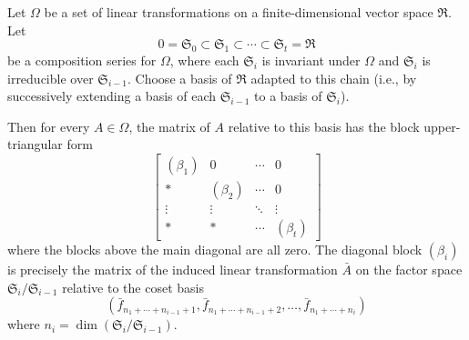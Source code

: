 Let $\Omega$ be a set of linear transformations on a finite-dimensional vector space $\mathfrak{R}$. Let
$$0 = \mathfrak{S}_0 \subset \mathfrak{S}_1 \subset \cdots \subset \mathfrak{S}_t = \mathfrak{R}$$
be a composition series for $\Omega$, where each $\mathfrak{S}_i$ is invariant under $\Omega$ and $\mathfrak{S}_i$ is irreducible over $\mathfrak{S}_{i-1}$. Choose a basis of $\mathfrak{R}$ adapted to this chain (i.e., by successively extending a basis of each $\mathfrak{S}_{i-1}$ to a basis of $\mathfrak{S}_i$).

Then for every $A \in \Omega$, the matrix of $A$ relative to this basis has the block upper-triangular form
$$\begin{bmatrix}
(\beta_1) & 0 & \cdots & 0 \\
* & (\beta_2) & \cdots & 0 \\
\vdots & \vdots & \ddots & \vdots \\
* & * & \cdots & (\beta_t)
\end{bmatrix}$$
where the blocks above the main diagonal are all zero. The diagonal block $(\beta_i)$ is precisely the matrix of the induced linear transformation $\bar{A}$ on the factor space $\mathfrak{S}_i / \mathfrak{S}_{i-1}$ relative to the coset basis
$$(\bar{f}_{n_1+\cdots+n_{i-1}+1}, \bar{f}_{n_1+\cdots+n_{i-1}+2}, \dots, \bar{f}_{n_1+\cdots+n_i})$$
where $n_i = \dim(\mathfrak{S}_i / \mathfrak{S}_{i-1})$.
